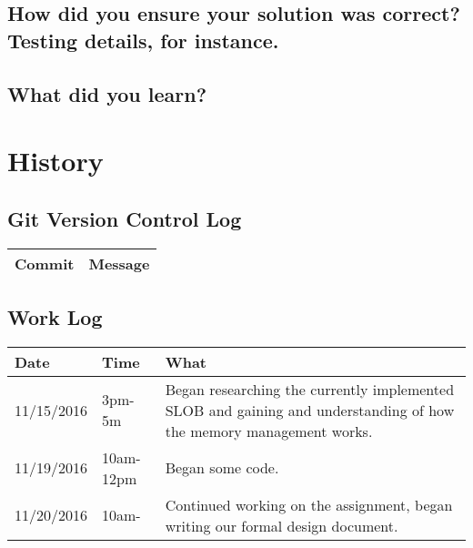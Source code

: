 \documentclass[letterpaper,10pt,titlepage]{article}
\begin{document}
\sloppy 

\subsection{How did you ensure your solution was correct? Testing details, for instance.}

\sloppy  

\subsection{What did you learn?}

\sloppy  


\section {History}
\subsection {Git Version Control Log}
\begin{tabular}{ |p{10cm}|p{3cm}| } 
 \hline
 Commit & Message \\
 \hline


\hline

\end{tabular}

\subsection{Work Log}
\begin{tabular}{ |p{3cm}|p{3cm}|p{5cm}| } 
\hline
Date & Time & What \\
\hline
11/15/2016& 3pm-5m& Began researching the currently implemented SLOB and gaining and understanding of how the memory management works. \\
 \hline
 11/19/2016& 10am-12pm& Began some code. \\
 \hline
 11/20/2016& 10am- & Continued working on the assignment, began writing our formal design document.\\
\end{tabular}
\end{document}
